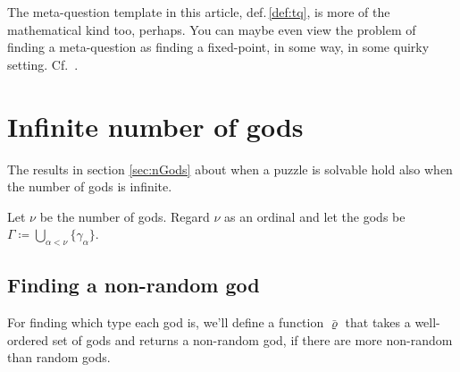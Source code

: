 \documentclass[twoside,twocolumn,a4paper,11pt]{article}
\theoremstyle{definition}
\begin{document}
%
The meta-question template in this article,
def.\,\ref{def:tq},
is more of the mathematical 
kind too, perhaps.
You can maybe even view the problem of finding a meta-question as
finding a fixed-point, in some way, in some quirky setting.
Cf.\ \cite{yan03}.
%
%
%
%



\section{Infinite number of gods}
\label{sec:infGods}
The results in section \ref{sec:nGods} about when a puzzle is solvable 
hold also when the number of gods is infinite.

Let $\nu$ be the number of gods. 
Regard $\nu$ as an ordinal and
let the gods be
$\Gamma\!\coloneqq\bigcup_{\alpha<\nu}\{\gamma_\alpha\}$.


\subsection{Finding a non-random god}

For finding which type each god is, we'll define a function
$\bar{\varrho}$ that 
takes a well-ordered set of gods and
returns a non-random god, if there are more non-random than 
random gods.
\end{document}
